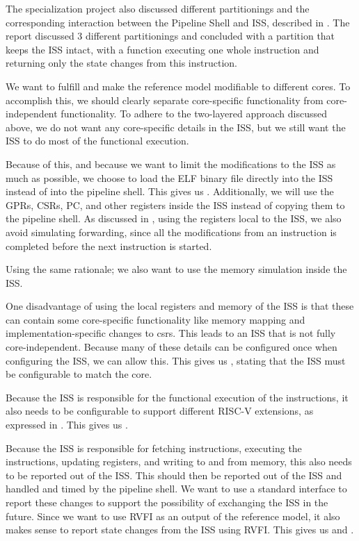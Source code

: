 The specialization project also discussed different partitionings and the corresponding interaction between the Pipeline Shell and ISS, described in . The report discussed 3 different partitionings and concluded with a partition that keeps the ISS intact, with a  function executing one whole instruction and returning only the state changes from this instruction. 

We want to fulfill  and make the reference model modifiable to different cores. To accomplish this, we should clearly separate core-specific functionality from core-independent functionality. To adhere to the two-layered approach discussed above, we do not want any core-specific details in the ISS, but we still want the ISS to do most of the functional execution. 

Because of this, and because we want to limit the modifications to the ISS as much as possible, we choose to load the ELF binary file directly into the ISS instead of into the pipeline shell. This gives us \textbf{}. Additionally, we will use the GPRs, CSRs, PC, and other registers inside the ISS instead of copying them to the pipeline shell. As discussed in , using the registers local to the ISS, we also avoid simulating forwarding, since all the modifications from an instruction is completed before the next instruction is started.

Using the same rationale; we also want to use the memory simulation inside the ISS.

One disadvantage of using the local registers and memory of the ISS is that these can contain some core-specific functionality like memory mapping and 
implementation-specific changes to \acrshort{csr}s. This leads to an ISS that is not fully core-independent. Because many of these details can be configured once when configuring the ISS, we can allow this. This gives us \textbf{}, stating that the ISS must be configurable to match the core.

Because the ISS is responsible for the functional execution of the instructions, it also needs to be configurable to support different RISC-V extensions, as expressed in \textbf{}. This gives us \textbf{}. 


Because the ISS is responsible for fetching instructions, executing the instructions, updating registers, and writing to and from memory, this also needs to be reported out of the ISS. This should then be reported out of the ISS and handled and timed by the pipeline shell. We want to use a standard interface to report these changes to support the possibility of exchanging the ISS in the future. Since we want to use RVFI as an output of the reference model, it also makes sense to report state changes from the ISS using RVFI. This gives us \textbf{} and \textbf{}.

